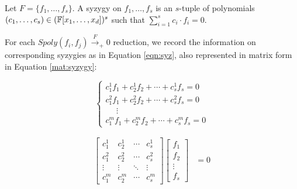 \begin{Definition}
Let $F = \{f_1,\dots,f_s\}$. A syzygy on $f_1,\dots,f_s$ is an
$s$-tuple of polynomials $(c_1,\dots,c_s)\in ({\mathbb{F}}[x_1,\dots,x_d])^s$
such that $\sum_{i=1}^s c_i\cdot f_i = 0$.
\end{Definition}

For each $Spoly(f_i,f_j)\xrightarrow{F}_+0$ reduction, we record the
information on corresponding syzygies as in Equation \ref{eqn:syz}, also
represented in matrix form in Equation \ref{mat:syzygy}:


\begin{equation} \label{eqn:syz}
 \begin{cases}
 c_1^1f_1+c_2^1f_2+\cdots+c_s^1f_s = 0\\
 c_1^2f_1+c_2^2f_2+\cdots+c_s^2f_s  = 0\\
 \ \ \ \ \ \  \vdots \\
 c_1^mf_1+c_2^mf_2+\cdots+c_s^mf_s = 0  
 \end{cases}
\end{equation}

\begin{center}
\begin{align}
\label{mat:syzygy}
   \begin{bmatrix}
           c_1^1 & c_2^1 & \cdots & c_s^1 \\
           c_1^2 & c_2^2 & \cdots & c_s^2 \\
           \vdots & \vdots & \ddots & \vdots \\
           c_1^m & c_2^m & \cdots & c_s^m
         \end{bmatrix}
    \begin{bmatrix}
           f_{1} \\
           f_{2} \\
           \vdots \\
           f_{s}
         \end{bmatrix}
         &= 0
  \end{align}

\end{center}


